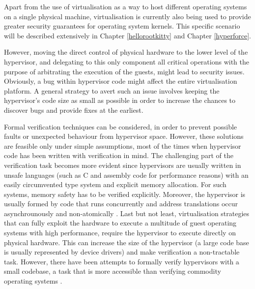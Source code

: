 Apart from the use of virtualisation as a way to host different operating systems on a single physical machine, virtualisation is currently also being used to provide greater security guarantees for operating system kernels.
This specific scenario will be described extensively in Chapter \ref{hellorootkitty} and Chapter \ref{hyperforce}.

However, moving the direct control of physical hardware to the lower level of the hypervisor, and delegating to this only component all critical operations with the purpose of arbitrating the execution of the guests, might lead to security issues. Obviously, a bug within hypervisor code might affect the entire virtualisation platform. 
A general strategy to avert such an issue involves keeping the hypervisor's code size as small as possible in order to increase the chances to discover bugs and provide fixes at the earliest.
 
Formal verification techniques can be considered, in order to prevent possible faults or unexpected behaviour from hypervisor space. However, these solutions are feasible only under simple assumptions, most of the times when hypervisor code has been written with verification in mind. 
The challenging part of the verification task becomes more evident since hypervisors are usually written in unsafe languages (such as C and assembly code for performance reasons) with an easily circumvented type system and explicit memory allocation. For such systems, memory safety has to be verified explicitly. Moreover, the hypervisor is usually formed by code that runs concurrently and address translations occur asynchrounously and non-atomically \cite{formalmethods,verifyhyperv}.  
Last but not least, virtualisation strategies that can fully exploit the hardware to execute a multitude of guest operating systems with high performance, require the hypervisor to execute directly on physical hardware. This can increase the size of the hypervisor (a large code base is usually represented by device drivers) and make verification a non-tractable task. However, there have been attempts to formally verify hypervisors with a small codebase, a task that is more accessible than verifying commodity operating systems \cite{verifyhyperv, formsecxenon}.   


